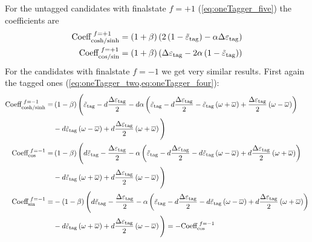 For the untagged candidates with finalstate $f=+1$ (\cref{eq:oneTagger_five}) the coefficients are
\begin{align*}
\text{Coeff}_\text{cosh/sinh}^{\hspace{0.3em}f=+1} &= \left(1+\beta\right)\left(2\left(1-\tilde{\varepsilon}_\text{tag}\right)
   -\alpha\Delta\varepsilon_\text{tag}\right)\\
   \text{Coeff}_\text{cos/sin}^{\hspace{0.3em}f=+1} &= \left(1+\beta\right)\left(\Delta\varepsilon_\text{tag}
   -2\alpha\left(1-\tilde{\varepsilon}_\text{tag}\right)\right)
\end{align*}
For the candidates with finalstate $f=-1$  we get very similar results. First again the tagged ones (\cref{eq:oneTagger_two,eq:oneTagger_four}):
\begin{align*}
\text{Coeff}_\text{cosh/sinh}^{\hspace{0.3em}f=-1} =& \left(1-\beta\right)\Bigg(\tilde{\varepsilon}_\text{tag}-d\frac{\Delta\varepsilon_\text{tag}}{2}
    -d\alpha\left(\tilde{\varepsilon}_\text{tag}-d\frac{\Delta\varepsilon_\text{tag}}{2}
    -\tilde{\varepsilon}_\text{tag}\left(\omega+\overline{\omega}\right)
    +\frac{\Delta\varepsilon_\text{tag}}{2}\left(\omega-\overline{\omega}\right)\right)\\
    &-d\tilde{\varepsilon}_\text{tag}\left(\omega-\overline{\omega}\right)
    +d\frac{\Delta\varepsilon_\text{tag}}{2}\left(\omega+\overline{\omega}\right)\Bigg)\\
\text{Coeff}_\text{cos}^{\hspace{0.3em}f=-1} =& \left(1-\beta\right)\Bigg(d\tilde{\varepsilon}_\text{tag}-\frac{\Delta\varepsilon_\text{tag}}{2}
    -\alpha\left(\tilde{\varepsilon}_\text{tag}-d\frac{\Delta\varepsilon_\text{tag}}{2}
    -d\tilde{\varepsilon}_\text{tag}\left(\omega-\overline{\omega}\right)
    +d\frac{\Delta\varepsilon_\text{tag}}{2}\left(\omega+\overline{\omega}\right)\right)\\
    &-d\tilde{\varepsilon}_\text{tag}\left(\omega+\overline{\omega}\right)
    +d\frac{\Delta\varepsilon_\text{tag}}{2}\left(\omega-\overline{\omega}\right)\Bigg)\\
\text{Coeff}_\text{sin}^{\hspace{0.3em}f=-1} =& -\left(1-\beta\right)\Bigg(d\tilde{\varepsilon}_\text{tag}-\frac{\Delta\varepsilon_\text{tag}}{2}
    -\alpha\left(\tilde{\varepsilon}_\text{tag}-d\frac{\Delta\varepsilon_\text{tag}}{2}
    -d\tilde{\varepsilon}_\text{tag}\left(\omega-\overline{\omega}\right)
    +d\frac{\Delta\varepsilon_\text{tag}}{2}\left(\omega+\overline{\omega}\right)\right)\\
    &-d\tilde{\varepsilon}_\text{tag}\left(\omega+\overline{\omega}\right)
    +d\frac{\Delta\varepsilon_\text{tag}}{2}\left(\omega-\overline{\omega}\right)\Bigg) = -\text{Coeff}_\text{cos}^{\hspace{0.3em}f=-1}
\end{align*}
